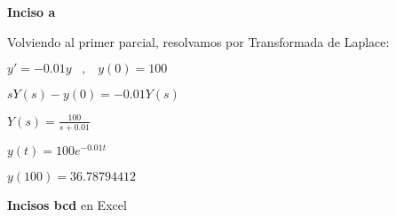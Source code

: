 \documentclass[11pt]{article}
\begin{document}
	\textbf{Inciso a}
	
	Volviendo al primer parcial, resolvamos por Transformada de Laplace:
	
	$y'=-0.01y \;\;\;,\;\;\;y(0)=100$
	
	$sY(s)-y(0)=-0.01Y(s)$
	
	$\displaystyle Y(s)=\frac{100}{s+0.01}$
	
	$\displaystyle y(t)=100e^{-0.01t}$
	
	$\displaystyle y(100)=36.78794412$
	
	\textbf{Incisos bcd} en Excel
\end{document}
